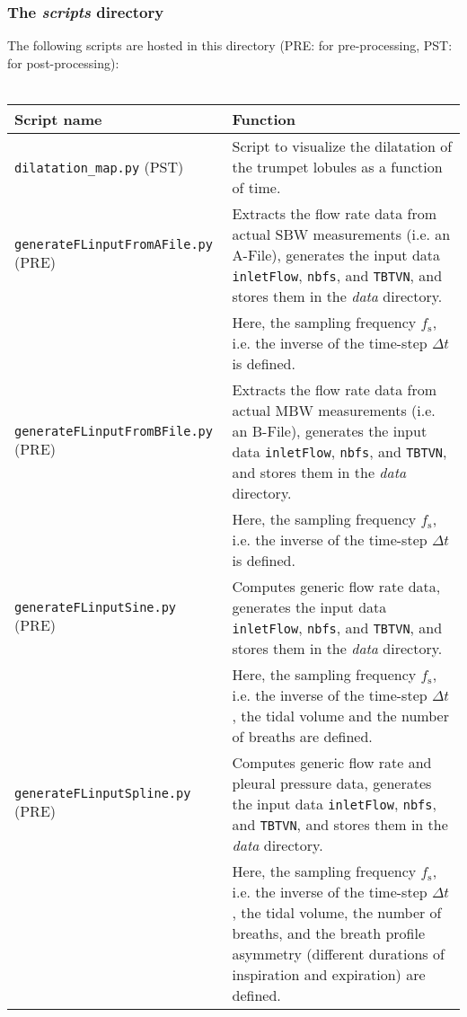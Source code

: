 \subsubsection{The \textit{scripts} directory}
The following scripts are hosted in this directory (PRE: for pre-processing, PST: for post-processing):
\\ \\
\begin{tabular}{L{0.4\textwidth} L{0.6\textwidth}}
  \toprule
  Script name          & Function \\
  \midrule
  \texttt{dilatation\_map.py} (PST) & Script to visualize the dilatation of the trumpet lobules as a function of time. \\
  \midrule
  \texttt{generateFLinputFromAFile.py} (PRE) & Extracts the flow rate data from actual SBW measurements (i.e. an A-File), generates the input data \texttt{inletFlow}, \texttt{nbfs}, and \texttt{TBTVN}, and stores them in the \textit{data} directory. \\
                                             & Here, the sampling frequency $f_\mathrm{s}$, i.e. the inverse of the time-step $\Delta t$ is defined. \\
  \midrule
  \texttt{generateFLinputFromBFile.py} (PRE) & Extracts the flow rate data from actual MBW measurements (i.e. an B-File), generates the input data \texttt{inletFlow}, \texttt{nbfs}, and \texttt{TBTVN}, and stores them in the \textit{data} directory. \\
                                             & Here, the sampling frequency $f_\mathrm{s}$, i.e. the inverse of the time-step $\Delta t$ is defined. \\
  \midrule
  \texttt{generateFLinputSine.py} (PRE) & Computes generic flow rate data, generates the input data \texttt{inletFlow}, \texttt{nbfs}, and \texttt{TBTVN}, and stores them in the \textit{data} directory. \\
                                        & Here, the sampling frequency $f_\mathrm{s}$, i.e. the inverse of the time-step $\Delta t$, the tidal volume and the number of breaths are defined. \\
  \midrule
  \texttt{generateFLinputSpline.py} (PRE) & Computes generic flow rate and pleural pressure data, generates the input data \texttt{inletFlow}, \texttt{nbfs}, and \texttt{TBTVN}, and stores them in the \textit{data} directory. \\
                                          & Here, the sampling frequency $f_\mathrm{s}$, i.e. the inverse of the time-step $\Delta t$, the tidal volume, the number of breaths, and the breath profile asymmetry (different durations of inspiration and expiration) are defined. \\

\end{tabular}
